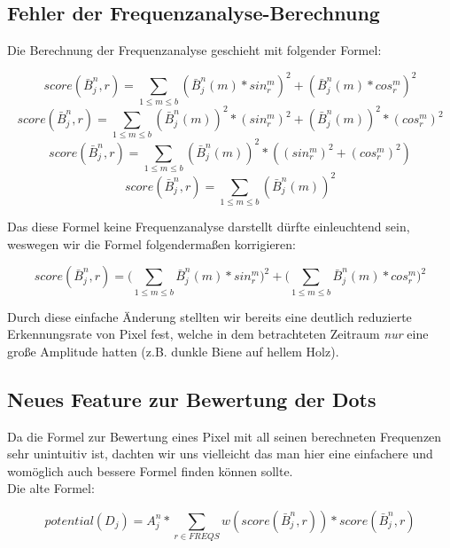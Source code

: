\documentclass[11pt,a4paper]{article}
\begin{document}
\subsection{Fehler der Frequenzanalyse-Berechnung}%
Die Berechnung der Frequenzanalyse geschieht mit folgender Formel:
\begin{center}
\begin{equation} 
score(\bar{B}_j^n, r) = \sum_{1\le m\le b} (\bar{B}_j^n(m) * sin_r^m)^2+(\bar{B}_j^n(m) * cos_r^m)^2
\end{equation}
\begin{equation} 
score(\bar{B}_j^n, r) = \sum_{1\le m\le b} (\bar{B}_j^n(m)) ^2 * (sin_r^m) ^2+(\bar{B}_j^n(m)) ^2 * (cos_r^m) ^2
\end{equation}
\begin{equation} 
score(\bar{B}_j^n, r) = \sum_{1\le m\le b} (\bar{B}_j^n(m)) ^2 * ((sin_r^m) ^2+ (cos_r^m) ^2)
\end{equation}
\begin{equation} 
score(\bar{B}_j^n, r) = \sum_{1\le m\le b} (\bar{B}_j^n(m)) ^2
\end{equation}
\end{center}

Das diese Formel keine Frequenzanalyse darstellt dürfte einleuchtend sein, weswegen wir die Formel folgendermaßen korrigieren:
\begin{center}
\begin{equation} 
score(\bar{B}_j^n, r) = \big(\sum_{1\le m\le b} \bar{B}_j^n(m) * sin_r^m\big)^2 +  \big(\sum_{1\le m\le b} \bar{B}_j^n(m) * cos_r^m\big)^2
\end{equation}
\end{center}

Durch diese einfache Änderung stellten wir bereits eine deutlich reduzierte Erkennungsrate von Pixel fest, welche in dem betrachteten Zeitraum \emph{nur} eine große Amplitude hatten (z.B. dunkle Biene auf hellem Holz).

\subsection{Neues Feature zur Bewertung der Dots}%
Da die Formel zur Bewertung eines Pixel mit all seinen berechneten Frequenzen sehr unintuitiv ist, dachten wir uns vielleicht das man hier eine einfachere und womöglich auch bessere Formel finden können sollte.\\
Die alte Formel:
\begin{center}
\begin{equation} 
potential(D_j)=A^n_j*\sum_{r\in FREQS}w(score(\bar{B}_j^n, r)) * score(\bar{B}_j^n,r)
\end{equation}
\end{center}
\end{document}

